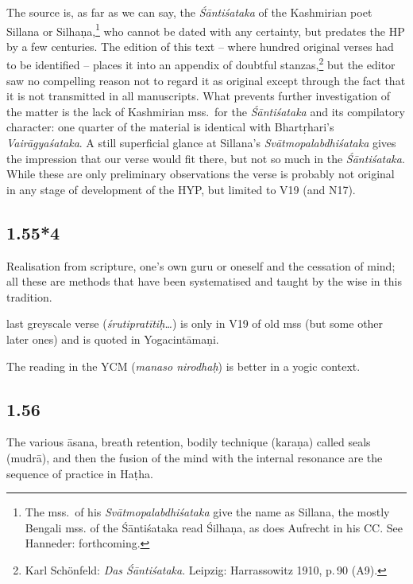 \begin{ekdosis}
\begin{philcomm}[hp01_055_3]
The source is, as far as we can say, the \emph{Śāntiśataka} of the Kashmirian poet Sillana or
Silhaṇa,\footnote{The mss.\ of his \emph{Svātmopalabdhiśataka} give the name as Sillana, the mostly
Bengali mss. of the Śāntiśataka read Śilhaṇa, as does Aufrecht in his CC. See Hanneder:
forthcoming.} who cannot be dated with any certainty, but predates the HP by a few centuries. The
edition of this text – where hundred original verses had to be identified – places it into an
appendix of doubtful stanzas,\footnote{Karl Schönfeld: \emph{Das Śāntiśataka}. Leipzig:
Harrassowitz 1910, p.\,90 (A9).} but the editor saw no compelling reason not to regard it as
original except through the fact that it is not transmitted in all manuscripts.  What prevents
further investigation of the matter is the lack of Kashmirian mss.\ for the \emph{Śāntiśataka} and
its compilatory character: one quarter of the material is identical with Bhartṛhari's
\emph{Vairāgyaśataka}. A still superficial glance at Sillana's \emph{Svātmopalabdhiśataka} gives
the impression that our verse would fit there, but not so much in the \emph{Śāntiśataka}.  While
these are only preliminary observations the verse is probably not original in any stage of
development of the HYP, but limited to V19 (and N17).
\end{philcomm}

\subsection*{1.55*4}
\begin{translation}[hp01_055_4]
Realisation from scripture, one's own guru or oneself and the cessation of mind; all these are methods that have been systematised and taught by the wise in this tradition.
\end{translation}

\begin{philcomm}[hp01_055_4]
last greyscale verse (\emph{śrutipratītiḥ…}) is only in V19 of old mss (but some other later ones) and is quoted in Yogacintāmaṇi.

The reading in the YCM (\emph{manaso nirodhaḥ}) is better in a yogic context.
\end{philcomm}

\subsection*{1.56}
\begin{translation}[hp01_056]
The various āsana, breath retention, bodily technique (karaṇa) called seals (mudrā), and then the fusion of the mind with the internal resonance are the sequence of practice in Haṭha.
\end{translation}


\end{ekdosis}

